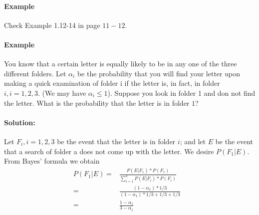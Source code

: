 \documentclass[10 pt,final]{article}
\begin{document}
\paragraph{Example} Check Example 1.12-14 in page $11-12$.

\paragraph{Example} You know that a certain letter is equally likely to be in any one of the three different folders. Let $\alpha_i$ be the probability that you will find your letter upon making a quick examination of folder i if the letter is, in fact, in folder $i, i =1, 2, 3.$ (We may have $\alpha_i \le 1$). Suppose you look in folder 1 and don not find the letter. What is the probability that the letter is in folder $1$?

\paragraph{Solution: } Let $F_i, i= 1,2,3$ be the event that the letter is in folder $i$; and let $E$ be the event that a search of folder a does not come up with the letter. We desire $P(F_1|E)$. From Bayes' formula we obtain
\begin{align*}
P(F_1|E) = & \frac{P(E|F_1)*P(F_1)}{\sum^3_{i=1} P(E|F_i)*P(F_i)} & \\
= &\frac{(1-\alpha_1)*1/3}{(1-\alpha_1)*1/3 + 1/3 + 1/3} & \\
= & \frac{1-\alpha_1}{3- \alpha_1} &
\end{align*}


%
%

\end{document}
